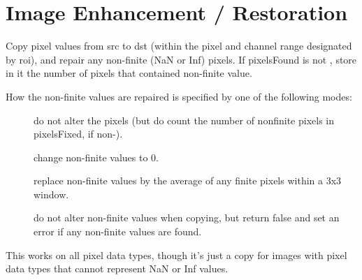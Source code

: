 \section{Image Enhancement / Restoration}
\label{sec:iba:enhance}

 

Copy pixel values from {\cf src} to {\cf dst} (within the pixel and channel
range designated by {\cf roi}), and repair any non-finite ({\cf NaN} or {\cf
Inf}) pixels.  If {\cf pixelsFound} is not \NULL, store in it the number of
pixels that contained non-finite value.

How the non-finite values are repaired is specified by one of the
following modes:

\begin{description}
\item[\spc] \spc
\item[\rm {}]   do not alter the pixels (but do count the number
                       of nonfinite pixels in {\cf *pixelsFixed}, if non-\NULL).
\item[\rm {}]  change non-finite values to 0.
\item[\rm {}]   replace non-finite values by the average of any
                     finite pixels within a 3x3 window.
\item[\rm {}]  do not alter non-finite values when copying,
                     but return {\cf false} and set an error if any non-finite
                     values are found.
\end{description}

This works on all pixel data types, though it's just a copy for images with
pixel data types that cannot represent {\cf NaN} or {\cf Inf} values.


